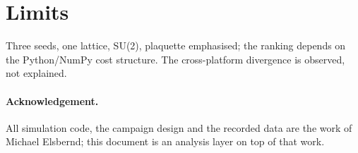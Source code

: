 \documentclass[11pt]{article}
\begin{document}
\section{Limits}
Three seeds, one lattice, SU(2), plaquette emphasised; the ranking depends on the
Python/NumPy cost structure. The cross-platform divergence is observed, not explained.

\paragraph{Acknowledgement.} All simulation code, the campaign design and the recorded data are the work
of Michael Elsbernd; this document is an analysis layer on top of that work.
\end{document}
